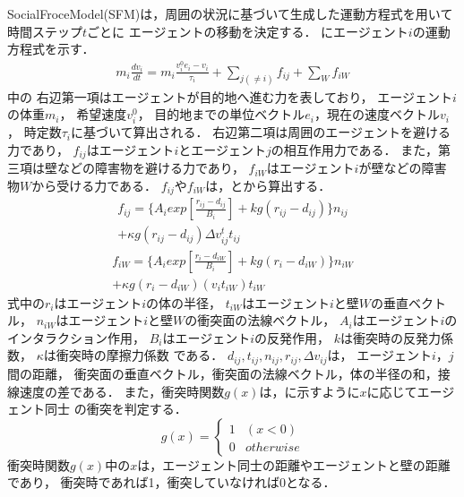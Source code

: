 SocialFroceModel(SFM)は，周囲の状況に基づいて生成した運動方程式を用いて時間ステップ$t$ごとに
エージェントの移動を決定する．
にエージェント$i$の運動方程式を示す．
%
\begin{eqnarray}
  m_i \frac{dv_i}{dt} = m_i \frac{v_i^0 e_i - v_i}{\tau_i}
  +\sum_{j(\neq i)}f_{ij}+\sum_{W}f_{iW}
  \label{eq:sfm_siki1}
\end{eqnarray}
%
中の
右辺第一項はエージェントが目的地へ進む力を表しており，
エージェント$i$の体重$m_i$，
希望速度$v_i^0$，
目的地までの単位ベクトル$e_i$，現在の速度ベクトル$v_i$，
時定数$\tau_i$に基づいて算出される．
右辺第二項は周囲のエージェントを避ける力であり，
$f_{ij}$はエージェント$i$とエージェント$j$の相互作用力である．
また，第三項は壁などの障害物を避ける力であり，
$f_{iW}$はエージェント$i$が壁などの障害物$W$から受ける力である．
$f_{ij}$や$f_{iW}$は，とから算出する．
%
\begin{eqnarray}
  f_{ij} =  \{A_i exp [\frac{r_{ij} - d_{ij}}{B_i}  ]
  + kg(r_{ij} - d_{ij})\} n_{ij} \\ \nonumber
  + \kappa g (r_{ij} - d_{ij}) \Delta
  v^t_{ij} t_{ij}
  \label{eq:sfm_siki2}
\end{eqnarray}
%
\begin{eqnarray}
  f_{iW} = \{A_i exp[\frac{r_{i} - d_{iW}}{B_i}]
  + kg(r_{i} - d_{iW})\} n_{iW} \\ \nonumber
  + \kappa g (r_{i} - d_{iW}) (v_i t_{iW}) t_{iW}
  \label{eq:sfm_siki3}
\end{eqnarray}
%
式中の$r_i$はエージェント$i$の体の半径，
$t_{iW}$はエージェント$i$と壁$W$の垂直ベクトル，
$n_{iW}$はエージェント$i$と壁$W$の衝突面の法線ベクトル，
$A_i$はエージェント$i$のインタラクション作用，
$B_i$はエージェント$i$の反発作用，
$k$は衝突時の反発力係数，
$\kappa$は衝突時の摩擦力係数
である．
$d_{ij}, t_{ij}, n_{ij}, r_{ij}, \Delta v_{ij}$は，
エージェント$i$，$j$間の距離，
衝突面の垂直ベクトル，衝突面の法線ベクトル，体の半径の和，接線速度の差である．
また，衝突時関数$g(x)$は，に示すように$x$に応じてエージェント同士
の衝突を判定する．
%
\begin{equation}
  \label{eq:gx_siki}
  g(x) =
  \begin{cases}
    1 & (x<0)     \\
    0 & otherwise
  \end{cases}
\end{equation}
%
衝突時関数$g(x)$中の$x$は，エージェント同士の距離やエージェントと壁の距離であり，
衝突時であれば1，衝突していなければ0となる．
\fi



%


